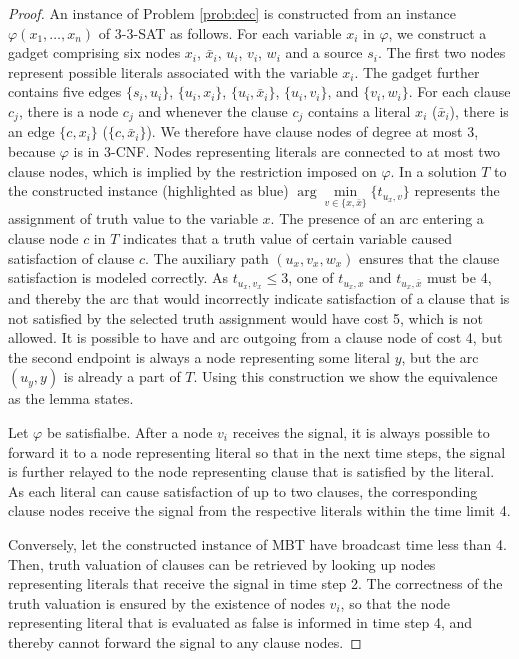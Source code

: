 \begin{proof}\label{prop:mbtnpc}
An instance of Problem \ref{prob:dec} is constructed from an instance $\varphi(x_1,\dots,x_n)$ of 3-3-SAT as follows.
For each variable $x_i$ in $\varphi$, we construct a gadget comprising six nodes $x_i$, $\bar{x}_i$, $u_i$, $v_i$, $w_i$ and a source $s_i$.
The first two nodes represent possible literals associated with the variable $x_i$.
The gadget further contains five edges $\{s_i,u_i\}$, $\{u_i,x_i\}$, $\{u_i,\bar{x}_i\}$, $\{u_i,v_i\}$, and $\{v_i,w_i\}$.
For each clause $c_j$, there is a node $c_j$ and whenever the clause $c_j$ contains a literal $x_i$ ($\bar{x}_i$), there is an edge $\{c,x_i\}$ ($\{c,\bar{x}_i\}$).
We therefore have clause nodes of degree at most 3, because $\varphi$ is in 3-CNF.
Nodes representing literals are connected to at most two clause nodes, which is implied by the restriction imposed on $\varphi$.
In a solution $T$ to the constructed instance (highlighted as blue)  $\arg\min\limits_{v\in\{x,\bar{x}\}}\{t_{u_x,v}\}$ represents the assignment of truth value to the variable $x$.
The presence of an arc entering a clause node $c$ in $T$ indicates that a truth value of certain variable caused satisfaction of clause $c$.
The auxiliary path $(u_x,v_x,w_x)$ ensures that the clause satisfaction is modeled correctly.
As $t_{u_x,v_x}\leq 3$, one of $t_{u_x,x}$ and $t_{u_x,\bar{x}}$ must be 4, 
and thereby the arc that would incorrectly indicate satisfaction of a clause that is not satisfied by the selected truth assignment would have cost 5, which is not allowed.
It is possible to have and arc outgoing from a clause node of cost 4, but the second endpoint is always a node representing some literal $y$, but the arc $(u_y,y)$ is already a part of $T$.
Using this construction we show the equivalence as the lemma states.

Let $\varphi$ be satisfialbe.
After a node $v_i$ receives the signal, it is always possible to forward it to a node representing literal so that in the next time steps,
the signal is further relayed to the node representing clause that is satisfied by the literal.
As each literal can cause satisfaction of up to two clauses, the corresponding clause nodes receive the signal from the respective literals within the time limit 4.

Conversely, let the constructed instance of MBT have broadcast time less than 4.
Then, truth valuation of clauses can be retrieved by looking up nodes representing literals that receive the signal in time step 2.
The correctness of the truth valuation is ensured by the existence of nodes $v_i$, so that the node representing literal that is evaluated as false is informed in time step 4, 
and thereby cannot forward the signal to any clause nodes.
\end{proof}

